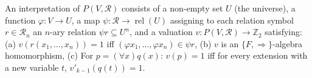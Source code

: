 An interpretation of $P(V, \mathcal{R})$ consists of a non-empty set $U$ (the universe), a function $\varphi: V \rightarrow U$, a map $\psi: \mathcal{R} \rightarrow \operatorname{rel}(U)$ assigning to each relation symbol $r \in \mathcal{R}_n$ an $n$-ary relation $\psi r \subseteq U^n$, and a valuation $v: P(V, \mathcal{R}) \rightarrow \mathbb{Z}_2$ satisfying:
(a) $v(r(x_1, \ldots, x_n)) = 1$ iff $(\varphi x_1, \ldots, \varphi x_n) \in \psi r$,
(b) $v$ is an $\{F, \Rightarrow\}$-algebra homomorphism,
(c) For $p = (\forall x)q(x)$: $v(p) = 1$ iff for every extension with a new variable $t$, $v'_{k-1}(q(t)) = 1$.
